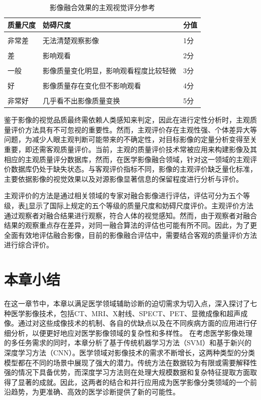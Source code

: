    \begin{table}[htbp]
      \centering
          \caption{影像融合效果的主观视觉评分参考\cite{韦玉春2007遥感数字图像处理教程,tang2020perceptual}}\label{subjective_evaluation}
            \begin{tabular}{m{3.1cm}<{\centering}m{7cm}<{\centering}m{2.1cm}<{\centering}}
            \hline
            质量尺度 &妨碍尺度 & 分值 \\  \hline  \\
            非常差 &无法清楚观察影像  &1分\\  \\
            差	&影响观看  &2分 \\  \\
            一般 &影像质量变化明显，影响观看程度比较轻微  &3分 \\  \\
            好  &影像质量存在变化但不影响观看  &4分 \\  \\
            非常好 &几乎看不出影像质量变换  &5分  \\  \hline
            \end{tabular} 
    \end{table}
鉴于影像的视觉品质最终需依赖人类感知来判定，因此在进行定性分析时，主观质量评价方法具有不可忽视的重要性。然而，主观评价存在主观性强、个体差异大等问题，为减少人眼主观判断可能带来的不确定性，对目标影像的定量分析变得至关重要，即还需客观质量评价。当前，主观的质量评价技术常被应用来构建影像及其相应的主观质量评分数据库，然而，在医学影像融合领域，针对这一领域的主观评价数据库仍处于缺失状态。与客观评价指标不同，影像的主观评价缺乏量化标准，主要依据影像的视觉效果以及对源影像显著信息的保留程度进行分析与评价。

    
主观评价的方法是通过相关领域的专家对融合影像进行评估，评估可分为五个等级，表\ref{subjective_evaluation}显示了国际上规定的五个等级的质量尺度和妨碍尺度评价\cite{韦玉春2007遥感数字图像处理教程,tang2020perceptual}。主观评价方法通过观察者对融合结果进行观察，符合人体的视觉感知。然而，由于观察者对融合结果的观察重点存在差异，对同一融合算法的评估也可能有所不同。因此，为了更全面有效地评估融合影像，目前的影像融合评估中，需要结合客观的质量评价方法进行综合评价。


\section{本章小结}
在这一章节中，本章以满足医学领域辅助诊断的迫切需求为切入点，深入探讨了七种医学影像技术，包括CT、MRI、X射线、SPECT、PET、显微成像和超声成像。通过对这些成像技术的机制、各自的优缺点以及在不同疾病方面的应用进行仔细分析，以便更好地应对医学影像领域的复杂性和多样性。
在考虑医学影像处理的多任务需求的同时，本章分析了基于传统机器学习方法（SVM）和基于新兴的深度学习方法（CNN）。医学领域对影像技术的需求不断增长，这两种类型的分类模型都在不同的场景中展现了强大的潜力。传统方法在数据较为有限或需要解释性强的情况下具备优势，而深度学习方法则在处理大规模数据和复杂特征提取方面取得了显著的成就。因此，这两者的结合和并行应用成为医学影像分类领域的一个前沿趋势，为更准确、高效的医学诊断提供了新的可能性。

